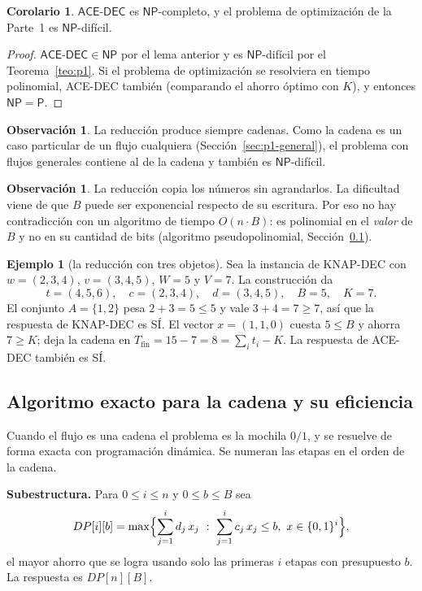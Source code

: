 \documentclass[11pt,a4paper]{article}
\theoremstyle{definition}
\newtheorem{corolario}[definicion]{Corolario}
\newtheorem{observacion}[definicion]{Observación}
\newtheorem{ejemplo}[definicion]{Ejemplo}
\newcommand{\Tfin}{T_{\mathrm{fin}}}
\newcommand{\ACE}{\textsf{ACE-DEC}}
\newcommand{\KNAP}{\textsf{KNAP-DEC}}
\newcommand{\NP}{\mathsf{NP}}
\begin{document}
\begin{corolario}
$\ACE$ es $\NP$-completo, y el problema de optimización de la Parte~1 es $\NP$-difícil.
\end{corolario}
\begin{proof}
$\ACE\in\NP$ por el lema anterior y es $\NP$-difícil por el Teorema~\ref{teo:p1}. Si el problema de optimización se resolviera en tiempo polinomial, \ACE{} también (comparando el ahorro óptimo con $K$), y entonces $\NP=\mathsf{P}$.
\end{proof}

\begin{observacion}
La reducción produce siempre cadenas. Como la cadena es un caso particular de un flujo cualquiera (Sección~\ref{sec:p1-general}), el problema con flujos generales contiene al de la cadena y también es $\NP$-difícil.
\end{observacion}

\begin{observacion}
La reducción copia los números sin agrandarlos. La dificultad viene de que $B$ puede ser exponencial respecto de su escritura. Por eso no hay contradicción con un algoritmo de tiempo $O(n\cdot B)$: es polinomial en el \emph{valor} de $B$ y no en su cantidad de bits (algoritmo pseudopolinomial, Sección~\ref{sec:p1-alg}).
\end{observacion}

\begin{ejemplo}[la reducción con tres objetos]
Sea la instancia de \KNAP{} con $w=(2,3,4)$, $v=(3,4,5)$, $W=5$ y $V=7$. La construcción da
\[
t=(4,5,6),\quad c=(2,3,4),\quad d=(3,4,5),\quad B=5,\quad K=7 .
\]
El conjunto $A=\{1,2\}$ pesa $2+3=5\le 5$ y vale $3+4=7\ge 7$, así que la respuesta de \KNAP{} es SÍ. El vector $x=(1,1,0)$ cuesta $5\le B$ y ahorra $7\ge K$; deja la cadena en $\Tfin=15-7=8=\sum_i t_i-K$. La respuesta de \ACE{} también es SÍ.
\end{ejemplo}

\subsection{Algoritmo exacto para la cadena y su eficiencia}\label{sec:p1-alg}

Cuando el flujo es una cadena el problema es la mochila $0/1$, y se resuelve de forma exacta con programación dinámica. Se numeran las etapas en el orden de la cadena.

\textbf{Subestructura.} Para $0\le i\le n$ y $0\le b\le B$ sea
\[
DP[i][b]=\max\Bigl\{\sum_{j=1}^{i}d_j\,x_j\ :\ \sum_{j=1}^{i}c_j\,x_j\le b,\ x\in\{0,1\}^i\Bigr\},
\]
el mayor ahorro que se logra usando solo las primeras $i$ etapas con presupuesto $b$. La respuesta es $DP[n][B]$.
\end{document}
